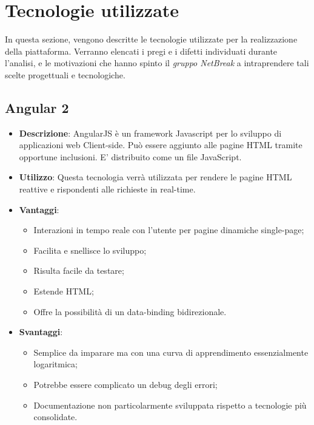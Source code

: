 \newpage
\section{Tecnologie utilizzate}
In questa sezione, vengono descritte le tecnologie utilizzate per la realizzazione della piattaforma. Verranno elencati i pregi e i difetti individuati durante l'analisi, e le motivazioni che hanno spinto il \textit{gruppo NetBreak} a intraprendere tali scelte progettuali e tecnologiche.

\subsection{Angular 2}
\begin{itemize}
	\item \textbf{Descrizione}: AngularJS è un framework Javascript per lo sviluppo di applicazioni web Client-side. Può essere aggiunto alle pagine HTML tramite opportune inclusioni. E' distribuito come un file JavaScript.
	\item \textbf{Utilizzo}: Questa tecnologia verrà utilizzata per rendere le pagine HTML reattive e rispondenti alle richieste in real-time.
	\item \textbf{Vantaggi}: 
	\begin{itemize}
		\item Interazioni in tempo reale con l'utente per pagine dinamiche single-page;
		\item Facilita e snellisce lo sviluppo;
		\item Risulta facile da testare;
		\item Estende HTML;
		\item Offre la possibilità di un data-binding bidirezionale.
	\end{itemize}
	\item \textbf{Svantaggi}:
	\begin{itemize}
		\item Semplice da imparare ma con una curva di apprendimento essenzialmente logaritmica;
		\item Potrebbe essere complicato un debug degli errori;
		\item Documentazione non particolarmente sviluppata rispetto a tecnologie più consolidate.
	\end{itemize}
\end{itemize}

